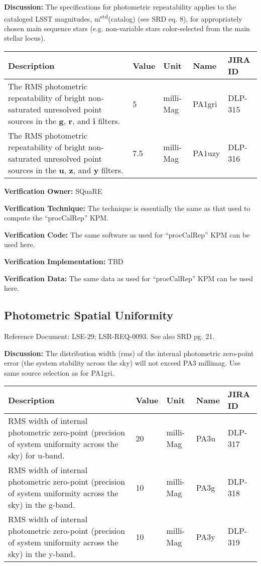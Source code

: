 \documentclass[DM,lsstdraft,toc]{lsstdoc}
\begin{document}
\textbf{Discussion:} The specifications for photometric repeatability
applies to the cataloged LSST magnitudes,
m\textsuperscript{std}(catalog) (see SRD eq. 8), for appropriately
chosen main sequence stars (e.g. non-variable stars color-selected from
the main stellar locus).

\begin{longtable}[]{@{}p{}llll@{}}
\toprule
Description & Value & Unit & Name & JIRA ID\tabularnewline
\midrule
\endhead
The RMS photometric repeatability of bright non-saturated unresolved
point sources in the \textbf{g}, \textbf{r}, and \textbf{i} filters. & 5
& milli-Mag & PA1gri & DLP-315\tabularnewline
The RMS photometric repeatability of bright non-saturated unresolved
point sources in the \textbf{u}, \textbf{z}, and \textbf{y} filters. &
7.5 & milli-Mag & PA1uzy & DLP-316\tabularnewline
\bottomrule
\end{longtable}

\textbf{Verification Owner:} SQuaRE

\textbf{Verification Technique:} The technique is essentially the same
as that used to compute the ``procCalRep'' KPM.

\textbf{Verification Code:} The same software as used for ``procCalRep''
KPM can be used here.

\textbf{Verification Implementation:} TBD

\textbf{Verification Data:} The same data as used for ``procCalRep'' KPM
can be used here.

\subsection{Photometric Spatial
Uniformity}\label{photometric-spatial-uniformity}

Reference Document: LSE-29; LSR-REQ-0093. See also SRD pg. 21.

\textbf{Discussion:} The distribution width (rms) of the internal
photometric zero-point error (the system stability across the sky) will
not exceed PA3 millimag. Use same source selection as for PA1gri.

\begin{longtable}[]{@{}p{}llll@{}}
\toprule
Description & Value & Unit & Name & JIRA ID\tabularnewline
\midrule
\endhead
RMS width of internal photometric zero-point (precision of system
uniformity across the sky) for u-band. & 20 & milli-Mag & PA3u &
DLP-317\tabularnewline
RMS width of internal photometric zero-point (precision of system
uniformity across the sky) in the g-band. & 10 & milli-Mag & PA3g &
DLP-318\tabularnewline
RMS width of internal photometric zero-point (precision of system
uniformity across the sky) in the y-band. & 10 & milli-Mag & PA3y &
DLP-319\tabularnewline
\bottomrule
\end{longtable}
\end{document}
